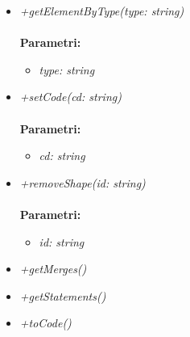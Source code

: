 \begin{itemize}
\begin{itemize}
\begin{itemize}
    		\end{itemize}
    		\item \emph{+getElementByType(type: string)}\\
    		\\
    		\textbf{Parametri:}
    		\begin{itemize}
    			\item \emph{type: string}\\
    			
    		\end{itemize}
    		\item \emph{+setCode(cd: string)}\\
    		\\
    		\textbf{Parametri:}
    		\begin{itemize}
    			\item \emph{cd: string}\\
    			
    		\end{itemize}
    		\item \emph{+removeShape(id: string)}\\
    		\\
    		\textbf{Parametri:}
    		\begin{itemize}
    			\item \emph{id: string}\\
    			
    		\end{itemize}
    		\item \emph{+getMerges()}\\
    		
    		\item \emph{+getStatements()}\\
    		
    		\item \emph{+toCode()}\\
    		
		\end{itemize}
\end{itemize}